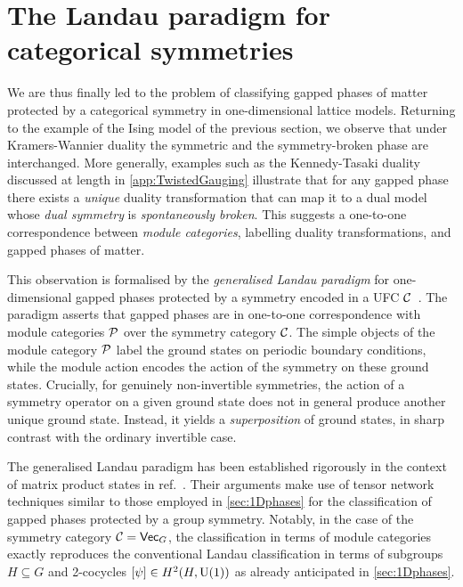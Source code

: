 \section{The Landau paradigm for categorical symmetries}\label{sec:GenLandau}
We are thus finally led to the problem of classifying gapped phases of matter protected by a categorical symmetry in one-dimensional lattice models. Returning to the example of the Ising model of the previous section, we observe that under Kramers-Wannier duality the symmetric and the symmetry-broken phase are interchanged. More generally, examples such as the Kennedy-Tasaki duality discussed at length in \cref{app:TwistedGauging} illustrate that for any gapped phase there exists a \emph{unique} duality transformation that can map it to a dual model whose \emph{dual symmetry} is \emph{spontaneously broken}. This suggests a one-to-one correspondence between \emph{module categories}, labelling duality transformations, and gapped phases of matter.

This observation is formalised by the \emph{generalised Landau paradigm} for one-dimensional gapped phases protected by a symmetry encoded in a UFC $\mathcal{C}$~\cite{Thorngren2019,GarreRubio2022,Bhardwaj2023,Lootens2024,Chen2025}. The paradigm asserts that gapped phases are in one-to-one correspondence with module categories $\mathcal{P}$ over the symmetry category $\mathcal{C}$. The simple objects of the module category $\mathcal{P}$ label the ground states on periodic boundary conditions, while the module action encodes the action of the symmetry on these ground states. Crucially, for genuinely non-invertible symmetries, the action of a symmetry operator on a given ground state does not in general produce another unique ground state. Instead, it yields a \emph{superposition} of ground states, in sharp contrast with the ordinary invertible case.

The generalised Landau paradigm has been established rigorously in the context of matrix product states in ref.~\cite{GarreRubio2022}. Their arguments make use of tensor network techniques similar to those employed in \cref{sec:1Dphases} for the classification of gapped phases protected by a group symmetry. Notably, in the case of the symmetry category $\mathcal{C}=\mathsf{Vec}_G$, the classification in terms of module categories exactly reproduces the conventional Landau classification in terms of subgroups $H\subseteq G$ and 2-cocycles $[\psi]\in H^2(H,{\rm U}(1))$ as already anticipated in \cref{sec:1Dphases}.

